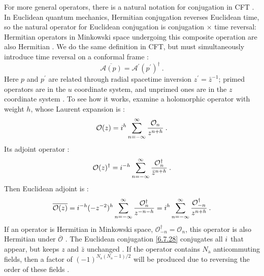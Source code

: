 For more general operators, there is a natural notation for conjugation in CFT . In Euclidean quantum mechanics, Hermitian conjugation reverses Euclidean time, so the natural operator for Euclidean conjugation is conjugation $\times$ time reversal: Hermitian operators in Minkowski space undergoing this composite operation are also Hermitian . We do the same definition in CFT, but must simultaneously introduce time reversal on a conformal frame :
\begin{equation}
	\overline{\mathscr{A}(p)}=\mathscr{A}^{\prime}(p^{\prime})^{\dagger}  \:. \label{6.7.28}
\end{equation}
Here $p$ and $p^{\prime}$ are related through radial spacetime inversion $z^{\prime}=\bar{z}^{-1}$; primed operators are in the $u$ coordinate system, and unprimed ones are in the $z$ coordinate system . To see how it works, examine a holomorphic operator with weight $h$, whose Laurent expansion is :
\begin{equation}
	\mathcal{O}(z)=i^{h} \sum_{n=-\infty}^{\infty} \frac{\mathcal{O}_{n}}{z^{n+h}} \:. \label{6.7.29}
\end{equation}
Its adjoint operator :
\begin{equation}
	\mathcal{O}(z)^{\dagger}=i^{-h} \sum_{n=-\infty}^{\infty} \frac{\mathcal{O}_{n}^{\dagger}}{\bar{z}^{n+h}} \:. \label{6.7.30}
\end{equation}
Then Euclidean adjoint is :
\begin{equation}
	\overline{\mathcal{O}(z)}=i^{-h} (-z^{-2})^{h} \sum_{n=-\infty}^{\infty} \frac{\mathcal{O}_{n}^{\dagger}}{z^{-n-h}} =i^{h} \sum_{n=-\infty}^{\infty} \frac{\mathcal{O}_{-n}^{\dagger}}{z^{n+h}} \:. \label{6.7.31}
\end{equation}
If an operator is Hermitian in Minkowski space, $\mathcal{O}_{-n}^{\dagger}=\mathcal{O}_{n}$, this operator is also Hermitian under $\overline{\mathcal{O}}$ . The Euclidean conjugation \eqref{6.7.28} conjugates all $i$ that appear, but keeps $z$ and $\bar{z}$ unchanged . If the operator contains $N_{\mathrm{a}}$ anticommuting fields, then a factor of $(-1)^{N_{\mathrm{a}}\left(N_{\mathrm{a}}-1\right) / 2}$ will be produced due to reversing the order of these fields .

